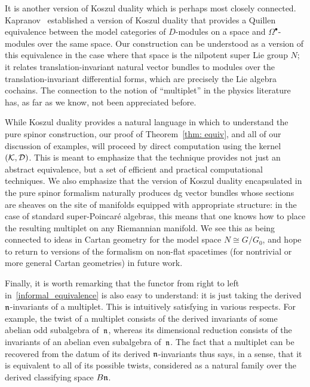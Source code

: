 \documentclass[pdftex]{sigma}
\numberwithin{equation}{section}
\def\bu{\bullet}
\begin{document}
It is another version of Koszul duality which is perhaps most closely connected. Kapranov~\cite{Kapranov} established a version of Koszul duality that provides a Quillen equivalence between the model categories of $D$-modules on a space and $\Omega^\bu$-modules over the same space. Our construction can be understood as a version of this equivalence in the case where that space is the nilpotent super Lie group $N$; it relates translation-invariant natural vector bundles to modules over the translation-invariant differential forms, which are precisely the Lie algebra cochains. The connection to the notion of ``multiplet'' in the physics literature has, as far as we know, not been appreciated before.

\begin{rmk}
	While Koszul duality provides a natural language in which to understand the pure spinor construction, our proof of Theorem~\ref{thm: equiv}, and all of our discussion of examples, will proceed by direct computation using the kernel $(\mathcal K,\mathcal D)$. This is meant to emphasize that the technique provides not just an abstract equivalence, but a set of efficient and practical computational techniques.
	We also emphasize that the version of Koszul duality encapsulated in the pure spinor formalism naturally produces dg vector bundles whose sections are sheaves on the site of manifolds equipped with appropriate structure: in the case of standard super-Poincar\'e algebras, this means that one knows how to place the resulting multiplet on any Riemannian manifold. We see this as being connected to ideas in Cartan geometry for the model space $N \cong G/G_0$, and hope to return to versions of the formalism on non-flat spacetimes (for nontrivial or more general Cartan geometries) in future work.
\end{rmk}

Finally, it is worth remarking that the functor from right to left in~\eqref{informal_equivalence} is also easy to understand: it is just taking the derived $\mathfrak n$-invariants of a multiplet. This is intuitively satisfying in various respects. For example, the twist of a multiplet consists of the derived invariants of some abelian odd subalgebra of~$\mathfrak n$, whereas its dimensional reduction consists of the invariants of an abelian even subalgebra of~$\mathfrak n$. The fact that a multiplet can be recovered from the datum of its derived $\mathfrak n$-invariants thus says, in a sense, that it is equivalent to all of its possible twists, considered as a natural family over the derived classifying space $B\mathfrak n$.
\end{document}
